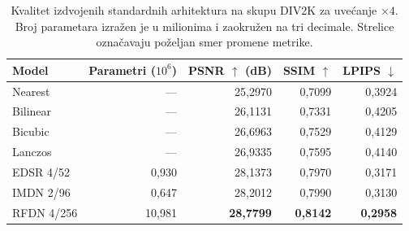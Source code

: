 \begin{table}[H]
    \centering
    \caption{Kvalitet izdvojenih standardnih arhitektura na skupu DIV2K za uvećanje $\times4$. Broj parametara izražen je u milionima i zaokružen na tri decimale. Strelice označavaju poželjan smer promene metrike.}
    \label{tab:results_4x_DIV2K}
    \begingroup
    \small
    \setlength{\tabcolsep}{4pt}
    \renewcommand{\arraystretch}{1.15}
    \begin{tabular}{@{}lrrrr@{}}
        \toprule
        Model & \shortstack{Parametri\\($10^6$)} & \shortstack{PSNR $\uparrow$\\(dB)} & SSIM $\uparrow$ & LPIPS $\downarrow$ \\
        \midrule
        Nearest & --- & 25,2970 & 0,7099 & 0,3924 \\
        Bilinear & --- & 26,1131 & 0,7331 & 0,4205 \\
        Bicubic & --- & 26,6963 & 0,7529 & 0,4129 \\
        Lanczos & --- & 26,9335 & 0,7595 & 0,4140 \\
        \midrule
        EDSR 4/52 & 0,930 & 28,1373 & 0,7970 & 0,3171 \\
        IMDN 2/96 & 0,647 & 28,2012 & 0,7990 & 0,3130 \\
        RFDN 4/256 & 10,981 & \textbf{28,7799} & \textbf{0,8142} & \textbf{0,2958} \\
        \bottomrule
    \end{tabular}
    \endgroup
\end{table}